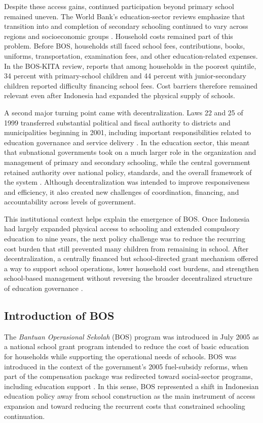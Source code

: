 \documentclass[a4paper, 12pt]{article}
\begin{document}
\begin{doublespacing}
Despite these access gains, continued participation beyond primary school remained uneven. The World Bank's education-sector reviews emphasize that transition into and completion of secondary schooling continued to vary across regions and socioeconomic groups \citep{WorldBank2013}. Household costs remained part of this problem. Before BOS, households still faced school fees, contributions, books, uniforms, transportation, examination fees, and other education-related expenses. In the BOS-KITA review, \citet{WorldBank2008} reports that among households in the poorest quintile, 34 percent with primary-school children and 44 percent with junior-secondary children reported difficulty financing school fees. Cost barriers therefore remained relevant even after Indonesia had expanded the physical supply of schools.

A second major turning point came with decentralization. Laws 22 and 25 of 1999 transferred substantial political and fiscal authority to districts and municipalities beginning in 2001, including important responsibilities related to education governance and service delivery \citep{Bjork2004}. In the education sector, this meant that subnational governments took on a much larger role in the organization and management of primary and secondary schooling, while the central government retained authority over national policy, standards, and the overall framework of the system \citep{Bjork2004,WorldBank2013}. Although decentralization was intended to improve responsiveness and efficiency, it also created new challenges of coordination, financing, and accountability across levels of government.

This institutional context helps explain the emergence of BOS. Once Indonesia had largely expanded physical access to schooling and extended compulsory education to nine years, the next policy challenge was to reduce the recurring cost burden that still prevented many children from remaining in school. After decentralization, a centrally financed but school-directed grant mechanism offered a way to support school operations, lower household cost burdens, and strengthen school-based management without reversing the broader decentralized structure of education governance \citep{Bjork2004,WorldBank2008}.

\subsection{Introduction of BOS}
The \textit{Bantuan Operasional Sekolah} (BOS) program was introduced in July 2005 as a national school grant program intended to reduce the cost of basic education for households while supporting the operational needs of schools. BOS was introduced in the context of the government's 2005 fuel-subsidy reforms, when part of the compensation package was redirected toward social-sector programs, including education support \citep{IsdijosoEtAl2006}. In this sense, BOS represented a shift in Indonesian education policy away from school construction as the main instrument of access expansion and toward reducing the recurrent costs that constrained schooling continuation.


\end{doublespacing}
\end{document}
